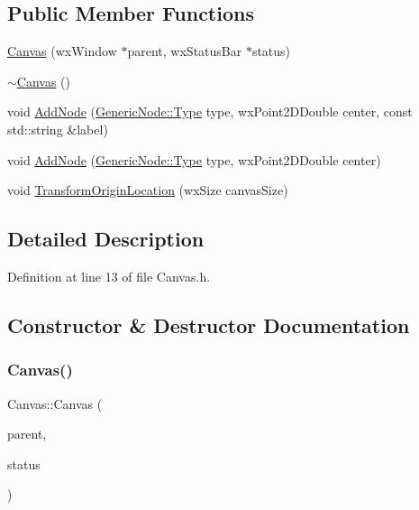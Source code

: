 \subsection*{Public Member Functions}
\begin{DoxyCompactItemize}
\item 
\hyperlink{class_canvas_ae31d296f6d7a0d3a2958ca1d7e61a51d}{Canvas} (wx\+Window $\ast$parent, wx\+Status\+Bar $\ast$status)
\item 
\hyperlink{class_canvas_a237c4549ad2e27c729cd1f71e89f0fd9}{$\sim$\+Canvas} ()
\item 
void \hyperlink{class_canvas_aec9038762b17b62ff6126bd6277a9cd8}{Add\+Node} (\hyperlink{class_generic_node_a9e7985ab9bbfa1c85091adc0ab71a6b6}{Generic\+Node\+::\+Type} type, wx\+Point2\+D\+Double center, const std\+::string \&label)
\item 
void \hyperlink{class_canvas_aaec53b68c7b24704e399b565731ed545}{Add\+Node} (\hyperlink{class_generic_node_a9e7985ab9bbfa1c85091adc0ab71a6b6}{Generic\+Node\+::\+Type} type, wx\+Point2\+D\+Double center)
\item 
void \hyperlink{class_canvas_a4afa0e24da7b82be3696131c13d89404}{Transform\+Origin\+Location} (wx\+Size canvas\+Size)
\end{DoxyCompactItemize}


\subsection{Detailed Description}


Definition at line 13 of file Canvas.\+h.



\subsection{Constructor \& Destructor Documentation}
\mbox{\label{class_canvas_ae31d296f6d7a0d3a2958ca1d7e61a51d}} 
\subsubsection{\texorpdfstring{Canvas()}{Canvas()}}
{\footnotesize\ttfamily Canvas\+::\+Canvas (\begin{DoxyParamCaption}\item[{wx\+Window $\ast$}]{parent,  }\item[{wx\+Status\+Bar $\ast$}]{status }\end{DoxyParamCaption})}



